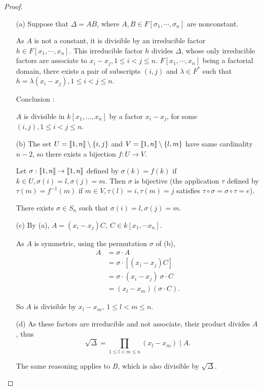 \documentclass[11pt,a4paper]{article}
\def\gcro{\mbox{[\hspace{-.15em}[}}%
\def\dcro{\mbox{]\hspace{-.15em}]}}
\begin{document}
\begin{proof}
\begin{enumerate}
\item[(a)] 
Suppose that $\Delta = A B$, where $A,B \in F[\sigma_1,\cdots,\sigma_n]$ are nonconstant.

As $A$ is not a constant, it is divisible by an irreducible factor $h \in F[x_1,\cdots,x_n]$. This irreducible factor $h$ divides $\Delta$, whose only irreducible factors are associate to $x_i-x_j,1\leq i<j\leq n$. $F[x_1,\cdots,x_n]$ being a factorial domain, there exists a pair of subscripts $(i,j)$ and $\lambda \in F^*$ such that $h =\lambda ( x_i-x_j),1\leq i<j\leq n$.

Conclusion : 

$A$ is divisible in $k[x_1,\ldots,x_n]$ by a factor $x_i-x_j$, for some $(i,j), 1 \leq i <j\leq n$.


\item[(b)] 
The set $U = \gcro1,n\dcro \setminus \{i,j\}$ and $V = \gcro1,n\dcro \setminus \{l,m\}$ have same cardinality $n-2$, so there exists a bijection $f : U \to V$.

Let $\sigma :\gcro1,n\dcro \to \gcro1,n\dcro$ defined by $\sigma(k) = f(k)$ if $k\in U, \sigma(i) = l, \sigma(j) = m$. Then $\sigma$ is bijective (the application $\tau$  defined by $\tau(m) = f^{-1}(m)$ if $m \in V, \tau(l)=i,\tau(m) = j$ satisfies $\tau \circ \sigma = \sigma \circ \tau = e$).

There exists $\sigma \in S_n$ such that $\sigma(i) = l, \sigma(j)=m$.


\item[(c)] 
By (a),
$A = (x_i-x_j) C,\ C \in k[x_1,\cdots x_n]$. 

As $A$ is symmetric, using the permutation $\sigma$ of (b), 
\begin{align*}
A &=\sigma\cdot A\\
&=\sigma\cdot[(x_i-x_j) C]\\
&= \sigma \cdot(x_i-x_j)\ \sigma\cdot C\\
&=(x_l-x_m) (\sigma\cdot C).
\end{align*}

So $A$ is divisible by $x_l-x_m,\ 1\leq l<m\leq n$.


\item[(d)] 
As these factors are irreducible and not associate, their product divides $A$, thus 
$$\sqrt{\Delta} = \prod_{1\leq l <m\leq n} (x_l-x_m) \mid A.$$

The same reasoning applies to $B$, which is also divisible by $\sqrt{\Delta}$.



\end{enumerate}
\end{proof}
\end{document}
